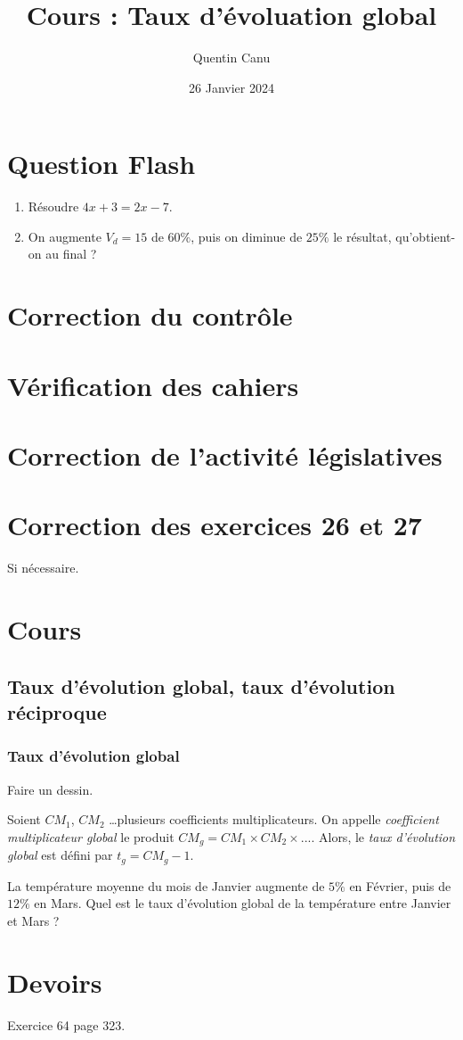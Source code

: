 \documentclass{article}
\title{Cours : Taux d'évoluation global}
\date{26 Janvier 2024}
\author{Quentin Canu}
\begin{document}
\maketitle
\section{Question Flash}
\begin{enumerate}
\item Résoudre $4x + 3 = 2x - 7$.
\item On augmente $V_d = 15$ de $60\%$, puis on diminue de $25\%$ le résultat, qu'obtient-on au final ?
\end{enumerate}
\section{Correction du contrôle}
\section{Vérification des cahiers}
\section{Correction de l'activité législatives}
\section{Correction des exercices 26 et 27}
Si nécessaire.

\section{Cours}
\subsection*{Taux d'évolution global, taux d'évolution réciproque}
\subsubsection*{Taux d'évolution global}
Faire un dessin.
\begin{definition}
Soient $CM_1$, $CM_2$ \dots plusieurs coefficients multiplicateurs. On appelle \emph{coefficient multiplicateur global} le produit $CM_g = CM_1 \times CM_2 \times ...$. Alors, le \emph{taux d'évolution global} est défini par $t_g = CM_g - 1$.
\end{definition}
\begin{example}
La température moyenne du mois de Janvier augmente de $5\%$ en Février, puis de $12\%$ en Mars. Quel est le taux d'évolution global de la température entre Janvier et Mars ?
\end{example}
\section{Devoirs}
Exercice 64 page 323.
\end{document}
